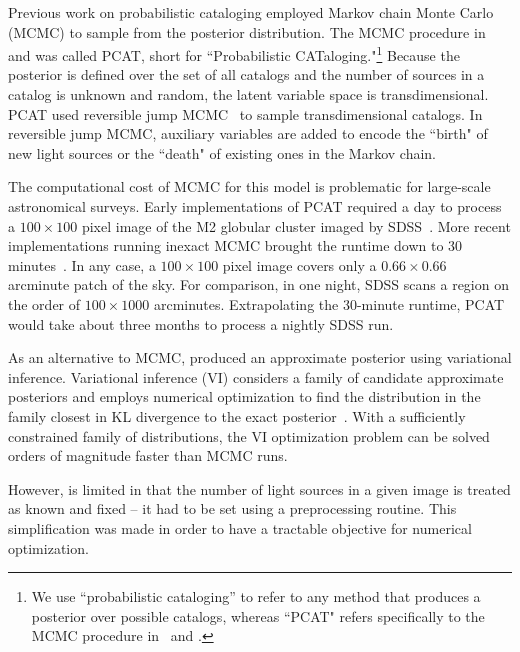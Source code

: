 Previous work on probabilistic cataloging employed Markov chain Monte Carlo (MCMC) to sample from the posterior distribution.
The MCMC procedure in~\cite{Portillo_2017} and \cite{Feder_2019}
was called PCAT, short for ``Probabilistic CATaloging."\footnote{
We use ``probabilistic cataloging'' to refer to any method that produces a posterior over possible catalogs, whereas ``PCAT" refers specifically to the MCMC procedure in~\cite{Portillo_2017} and \cite{Feder_2019}. }
Because the posterior is defined over the set of all catalogs and the number of sources in a catalog is unknown and random, 
the latent variable space is transdimensional. PCAT
used reversible jump MCMC~\citep{Green95reversiblejump} to sample transdimensional catalogs. In reversible jump MCMC, auxiliary variables are added to encode the ``birth" of new light sources 
or the ``death" of existing ones in the Markov chain.

The computational cost of MCMC for this model is problematic for large-scale astronomical surveys. 
Early implementations of PCAT required a day to process a $100\times 100$ pixel image of the M2 globular cluster imaged by SDSS~\citep{Portillo_2017}. 
More recent implementations running inexact MCMC brought the runtime down to 30  minutes~\citep{Feder_2019}.  
In any case, a $100\times 100$ pixel image covers only a $0.66 \times 0.66$ arcminute patch of the sky.
For comparison, in one night, SDSS scans a region on the order of $100 \times 1000$ arcminutes. 
Extrapolating the 30-minute runtime, PCAT would take about three months to process a nightly SDSS run. 

As an alternative to MCMC, \cite{regier2019_celeste} produced an approximate posterior using variational inference.
Variational inference (VI) considers a family of candidate approximate posteriors and employs numerical optimization to find the distribution in the family closest
in KL divergence to the exact posterior~\citep{Jordan_intro_vi, Wainwrite_graph_models_vi, Blei_2017_vi_review}. 
With a sufficiently constrained family of distributions, the VI optimization problem can be solved orders of magnitude faster than MCMC runs. 

However, \cite{regier2019_celeste} is limited in that the number of light sources in a given image is treated as known and fixed -- it had to be set using a preprocessing routine. 
This simplification was made in order to have a tractable objective for numerical optimization. 

\bigbreak


